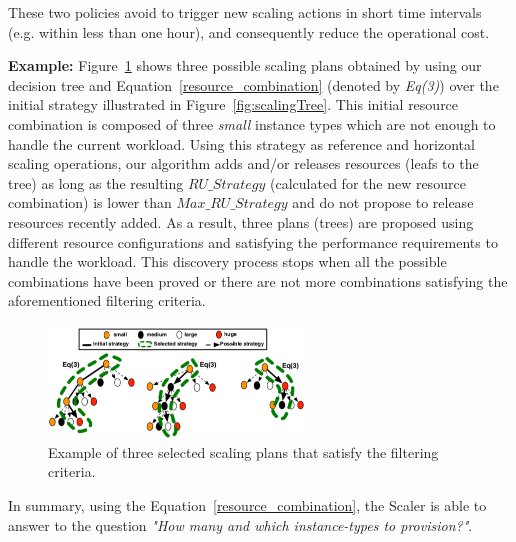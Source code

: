 These two policies avoid to trigger new scaling actions in short time intervals (e.g. within less than one hour), and consequently reduce the operational cost. 


\noindent\textbf{Example:} Figure~\ref{fig:scalingTreeSelection} shows three possible scaling plans obtained by using our decision tree and Equation~\ref{resource_combination} (denoted by \emph{Eq(3)}) over the initial strategy illustrated in Figure~\ref{fig:scalingTree}. This initial resource combination is composed of three \emph{small} instance types which are not enough to handle the current workload. Using this strategy as reference and horizontal scaling operations, our algorithm adds and/or releases resources (leafs to the tree) as long as the resulting \emph{$RU\_Strategy$} (calculated for the new resource combination) is lower than \emph{$Max\_RU\_Strategy$} and do not propose to release resources recently added. As a result, three plans (trees) are proposed using different resource configurations and satisfying the performance requirements to handle the workload. This discovery process stops when all the possible combinations have been proved or there are not more combinations satisfying the aforementioned filtering criteria. 



\begin{figure}[t]
  \begin{center}
    \includegraphics[width=0.7\linewidth,height=3cm]{images/optimalTree_selection}
  \end{center}
\vspace{-3mm}
  \caption{Example of three selected scaling plans that satisfy the filtering criteria.}
  \label{fig:scalingTreeSelection}
\end{figure}



In summary, using the Equation~\ref{resource_combination}, the Scaler is able to answer to the question \emph{"How many and which instance-types to provision?"}.


